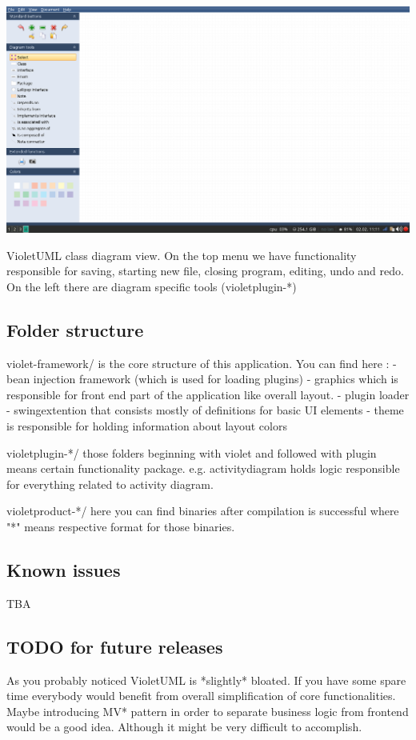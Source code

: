\documentclass{article}
\begin{document}
\includegraphics{assets/violetUI}

VioletUML class diagram view. On the top menu we have functionality responsible for saving, starting new file, closing program, editing, undo and redo.
On the left there are diagram specific tools (violetplugin-*)

\subsection{Folder structure}

violet-framework/ is the core structure of this application. You can find here :
- bean injection framework (which is used for loading plugins)
- graphics which is responsible for front end part of the application like overall layout.
- plugin loader
- swingextention that consists mostly of definitions for basic UI elements
- theme is responsible for holding information about layout colors

violetplugin-*/ those folders beginning with violet and followed with plugin means certain functionality
package. e.g. activitydiagram holds logic responsible for everything related to activity diagram.

violetproduct-*/ here you can find binaries after compilation is successful
where "*" means respective format for those binaries.

\subsection{Known issues}

TBA

\subsection{TODO for future releases}
As you probably noticed VioletUML is *slightly* bloated. If you have some spare time
everybody would benefit from overall simplification of core functionalities.
Maybe introducing MV* pattern in order to separate business logic from frontend would be a good idea.
Although it might be very difficult to accomplish.
\end{document}
